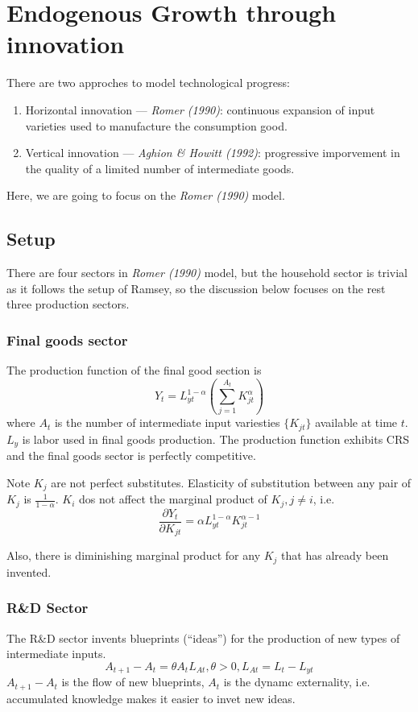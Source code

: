 \documentclass[twocolumn, fleqn]{article}
\begin{document}
	\section{Endogenous Growth through innovation}
		There are two approches to model technological progress:
		\begin{enumerate}
			\item Horizontal innovation --- \textit{Romer (1990)}: continuous expansion of input varieties used to
			manufacture the consumption good.
			\item Vertical innovation --- \textit{Aghion \& Howitt (1992)}: progressive imporvement in the quality of a
			limited number of intermediate goods.
		\end{enumerate}

		Here, we are going to focus on the \textit{Romer (1990)} model.

		\subsection{Setup}
			There are four sectors in \textit{Romer (1990)} model, but the household sector is trivial as it follows
			the setup of Ramsey, so the discussion below focuses on the rest three production sectors.

			\subsubsection{Final goods sector}
				The production function of the final good section is
				\begin{equation*}
				Y_t = L_{yt}^{1-\alpha}\left( \sum_{j=1}^{A_t} K_{jt}^\alpha  \right) \tag{5.1}
				\end{equation*}
				where $A_t$ is the number of intermediate input variesties $\{K_{jt}\}$ available at time $t$.
				$L_y$ is labor used in final goods production.
				The production function exhibits CRS and the final goods sector is perfectly competitive.

				Note $K_j$ are not perfect substitutes.
				Elasticity of substitution between any pair of $K_j$ is $\frac{1}{1-\alpha}$.
				$K_i$ dos not affect the marginal product of $K_j, j\neq i$, i.e.
				\[\frac{\partial Y_t}{\partial K_{jt}}= \alpha L_{yt}^{1-\alpha}K_{jt}^{\alpha-1}\]

				Also, there is diminishing marginal product for any $K_j$ that has already been invented.

			\subsubsection{R\&D Sector}
				The R\&D sector invents blueprints (``ideas'') for the production of new types of intermediate inputs.
				\begin{equation*}
					A_{t+1}-A_t = \theta A_t L_{At}, \theta>0, L_{At} = L_t - L_{yt} \tag{5.2}
				\end{equation*}
				$A_{t+1}-A_t$ is the flow of new blueprints, $A_t$ is the dynamc externality, i.e. accumulated
				knowledge makes it easier to invet new ideas.
\end{document}
